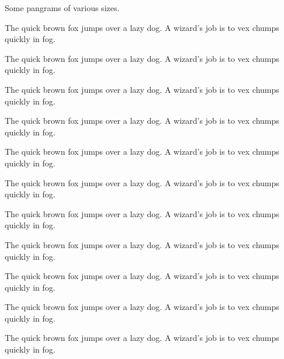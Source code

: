 \documentclass{amsart}
\begin{document}
Some pangrams of various sizes.

{\larger[5] The quick brown fox jumps over a lazy dog. A wizard's job is to vex chumps quickly in fog.}

{\larger[4] The quick brown fox jumps over a lazy dog. A wizard's job is to vex chumps quickly in fog.}

{\larger[3] The quick brown fox jumps over a lazy dog. A wizard's job is to vex chumps quickly in fog.}

{\larger[2] The quick brown fox jumps over a lazy dog. A wizard's job is to vex chumps quickly in fog.}

{\larger[1] The quick brown fox jumps over a lazy dog. A wizard's job is to vex chumps quickly in fog.}

{\smaller[0] The quick brown fox jumps over a lazy dog. A wizard's job is to vex chumps quickly in fog.}

{\smaller[1] The quick brown fox jumps over a lazy dog. A wizard's job is to vex chumps quickly in fog.}

{\smaller[2] The quick brown fox jumps over a lazy dog. A wizard's job is to vex chumps quickly in fog.}

{\smaller[3] The quick brown fox jumps over a lazy dog. A wizard's job is to vex chumps quickly in fog.}

{\smaller[4] The quick brown fox jumps over a lazy dog. A wizard's job is to vex chumps quickly in fog.}

{\smaller[5] The quick brown fox jumps over a lazy dog. A wizard's job is to vex chumps quickly in fog.}
\end{document}
